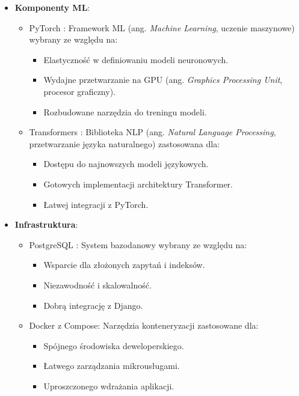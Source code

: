 \documentclass[a4paper,twoside,12pt]{book}
\begin{document}
\begin{itemize}
          \item \textbf{Komponenty ML}:
          \begin{itemize}
            \item PyTorch \cite{bib:pytorch}: Framework ML (ang. \textit{Machine Learning}, uczenie maszynowe) wybrany ze względu na:
                  \begin{itemize}
                    \item Elastyczność w definiowaniu modeli neuronowych.
                    \item Wydajne przetwarzanie na GPU (ang. \textit{Graphics Processing Unit}, procesor graficzny).
                    \item Rozbudowane narzędzia do treningu modeli.
                  \end{itemize}
            \item Transformers \cite{bib:transformers}: Biblioteka NLP (ang. \textit{Natural Language Processing}, przetwarzanie języka naturalnego) zastosowana dla:
                  \begin{itemize}
                    \item Dostępu do najnowszych modeli językowych.
                    \item Gotowych implementacji architektury Transformer.
                    \item Łatwej integracji z PyTorch.
                  \end{itemize}
          \end{itemize}
    \newpage
    \item \textbf{Infrastruktura}:
          \begin{itemize}
            \item PostgreSQL \cite{bib:postgresql}: System bazodanowy wybrany ze względu na:
                  \begin{itemize}
                    \item Wsparcie dla złożonych zapytań i indeksów.
                    \item Niezawodność i skalowalność.
                    \item Dobrą integrację z Django.
                  \end{itemize}
            \item Docker \cite{bib:docker} z Compose: Narzędzia konteneryzacji zastosowane dla:
                  \begin{itemize}
                    \item Spójnego środowiska deweloperskiego.
                    \item Łatwego zarządzania mikrousługami.
                    \item Uproszczonego wdrażania aplikacji.
                  \end{itemize}
          \end{itemize}
\end{itemize}
\end{document}
